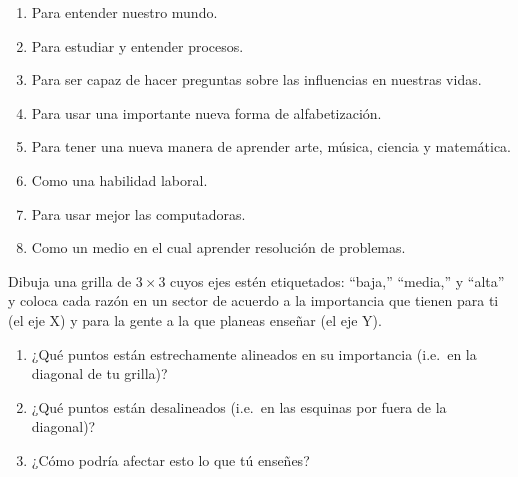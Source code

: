 \begin{enumerate}

\item
  Para entender nuestro mundo.

\item
  Para estudiar y entender procesos.

\item
  Para ser capaz de hacer preguntas sobre las influencias en nuestras vidas.

\item
Para usar una importante nueva forma de alfabetización.

\item
  Para tener una nueva manera de aprender arte, música, ciencia y matemática.

\item
  Como una habilidad laboral.

\item
  Para usar mejor las computadoras. 

\item
  Como un medio en el cual aprender resolución de problemas.

\end{enumerate}

Dibuja una grilla de $3{\times}3$ cuyos ejes estén etiquetados: ``baja,'' ``media,'' y ``alta''
y coloca cada razón en un sector
de acuerdo a la importancia que tienen para ti (el eje X)
y para la gente a la que planeas enseñar (el eje Y).

\begin{enumerate}

\item
  ¿Qué puntos están estrechamente alineados en su importancia
  (i.e.\ en la diagonal de tu grilla)?

\item
¿Qué puntos están desalineados
  (i.e.\ en las esquinas por fuera de la diagonal)?

\item
  ¿Cómo podría afectar esto lo que tú enseñes?

\end{enumerate}
